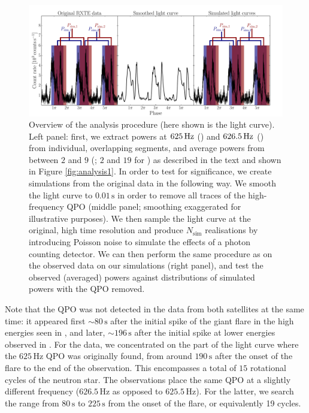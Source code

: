 \documentclass{emulateapj}
\begin{document}
\begin{figure}[htbp]
\begin{center}
\includegraphics[width=18cm]{f3.pdf}
\caption{Overview of the analysis procedure (here shown is the \rxte light curve). Left panel: first, we extract powers at $625\,\mathrm{Hz}$ (\rxte) and $626.5\,\mathrm{Hz}$ (\rhessi) from individual, overlapping segments, and average powers from between $2$ and $9$ (\rxte; $2$ and $19$ for \rhessi) as described in the text and shown in Figure \ref{fig:analysis1}. In order to test for significance, we create simulations from the original data in the following way. We smooth the light curve to $0.01\,\mathrm{s}$ in order to remove all traces of the high-frequency QPO (middle panel; smoothing exaggerated for illustrative purposes). We then sample the light curve at the original, high time resolution and produce $N_\mathrm{sim}$ realisations by introducing Poisson noise to simulate the effects of a photon counting detector. We can then perform the same procedure as on the observed data on our simulations (right panel), and test the observed (averaged) powers against distributions of simulated powers with the QPO removed.}
\label{fig:analysis2}
\end{center}
\end{figure}



Note that the QPO was not detected in the data from both satellites at the same time: it appeared first $\sim 80\,\mathrm{s}$ after the initial spike of the giant flare in the high energies seen in \rhessi, and later, $\sim 196 \,\mathrm{s}$ after the initial spike at lower energies observed in \rxte.
For the \rxte data, we concentrated on the part of the light curve where the $625 \, \mathrm{Hz}$ QPO was originally found, from around $190\, \mathrm{s}$ after the onset of the flare to the end of the observation. This encompasses a total of $15$ rotational cycles of the neutron star. The \rhessi observations place the same QPO at a slightly different frequency ($626.5 \, \mathrm{Hz}$ as opposed to $625.5 \, \mathrm{Hz}$). For the latter, we search the range from $80\, \mathrm{s}$ to $225 \, \mathrm{s}$ from the onset of the flare, or equivalently 19 cycles.
\end{document}
